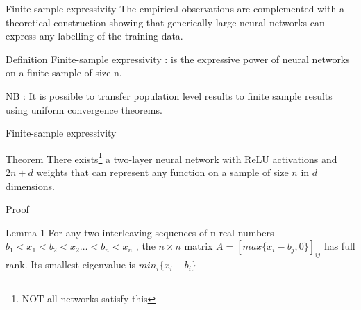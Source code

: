 \documentclass[10pt]{beamer}
\begin{document}
\begin{frame}{Finite-sample expressivity }
The empirical observations are complemented with a theoretical construction
showing that generically large neural networks can express any labelling of the training
data.
\pause
\begin{block}{Definition} Finite-sample expressivity : is the expressive power of neural networks on a
finite sample of size n.
\end{block}
\small
NB : It is possible to transfer population level results to finite sample results
using uniform convergence theorems.
\end{frame}	
\begin{frame}{Finite-sample expressivity }
\begin{block}{Theorem}
There exists\footnote{NOT all networks satisfy this} a two-layer neural network with ReLU activations and $2n+d$
weights that can represent any function on a sample of size $n$ in $d$ dimensions.
\end{block}
\end{frame}	
\begin{frame}{Proof }
\begin{block}{Lemma 1}
For any two interleaving sequences of n real numbers $b_1 < x_1 < b_2 < x_2 \dots < b_n < x_n$
, the $n \times n$ matrix $A = [max \{x_i - b_j,0\}]_{ij}$ has full rank. Its smallest eigenvalue is
$min_i\{ x_i - b_i\}$
\end{block}

	
	
\end{frame}	
\end{document}
